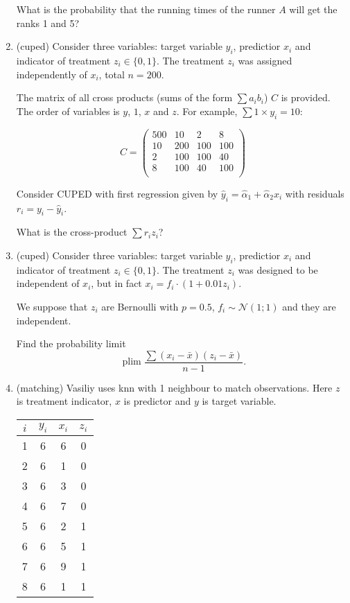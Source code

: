 \documentclass[12pt]{article}
\DeclareMathOperator{\plim}{plim}
\newcommand{\cN}{\mathcal{N}}
\begin{document}
\begin{enumerate}
    What is the probability that the running times of the runner $A$ will get the ranks 1 and 5?
    
    \item (cuped) Consider three variables: target variable $y_i$, predictior $x_i$ and indicator of treatment $z_i \in \{0,1\}$.
    The treatment $z_i$ was assigned independently of $x_i$, total $n=200$. 

    The matrix of all cross products (sums of the form $\sum a_i b_i$) $C$ is provided. 
    The order of variables is $y$, $1$, $x$ and $z$. For example, $\sum 1 \times y_i = 10$:

    \[
    C = \begin{pmatrix}
        500 & 10 & 2 & 8 \\
        10 & 200 & 100 & 100 \\
        2 &  100 & 100 &  40   \\
        8 &  100 & 40  & 100 \\
    \end{pmatrix}    
    \]
    
    Consider CUPED with first regression given by $\hat y_i = \hat\alpha_1 + \hat\alpha_2 x_i$ with residuals $r_i = y_i - \hat y_i$.

    What is the cross-product $\sum r_i z_i$?


    \item (cuped) Consider three variables: target variable $y_i$, predictior $x_i$ and indicator of treatment $z_i \in \{0,1\}$.
    The treatment $z_i$ was designed to be independent of $x_i$, but in fact $x_i = f_i \cdot (1 + 0.01 z_i)$.

    We suppose that $z_i$ are Bernoulli with $p=0.5$, $f_i \sim \cN(1;1)$ and they are independent.

    Find the probability limit 
    \[
    \plim \frac{\sum (x_i - \bar x)(z_i - \bar x)}{n-1}.    
    \]

    \item (matching) Vasiliy uses knn with 1 neighbour to match observations. 
    Here $z$ is treatment indicator, $x$ is predictor and $y$ is target variable. 

    \begin{tabular}{cccc}
    \toprule
    $i$ & $y_i$ & $x_i$ & $z_i$ \\
    \midrule
    1 & 6 & 6 & 0 \\
    2 & 6 & 1 & 0 \\
    3 & 6 & 3 & 0 \\
    4 & 6 & 7 & 0 \\
    5 & 6 & 2 & 1 \\
    6 & 6 & 5 & 1 \\
    7 & 6 & 9 & 1 \\        
    8 & 6 & 1 & 1 \\
    \bottomrule
    \end{tabular}


\end{enumerate}
\end{document}
